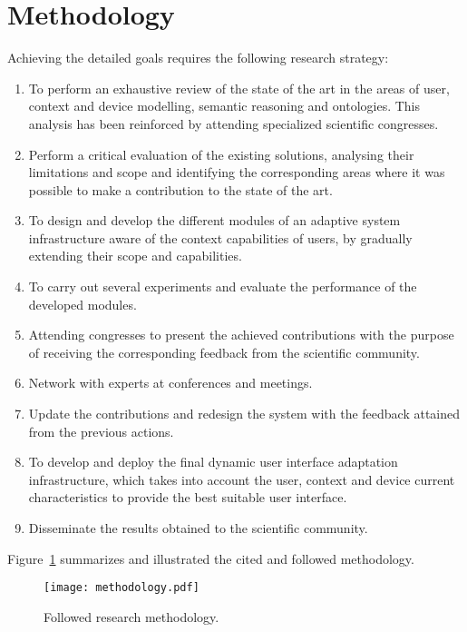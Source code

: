 
\section{Methodology}
\label{sec:methodology}

Achieving the detailed goals requires the following research strategy:

\begin{enumerate}[label=\alph*)]
  \item To perform an exhaustive review of the state of the art in the areas 
  of user, context and device modelling, semantic reasoning and ontologies.   
  This analysis has been reinforced by attending specialized scientific   
  congresses.
  
  \item Perform a critical evaluation of the existing solutions, analysing 
  their limitations and scope and identifying the corresponding areas where it 
  was possible to make a contribution to the state of the art.
  
  \item To design and develop the different modules of an adaptive system 
  infrastructure aware of the context capabilities of users, by gradually 
  extending their scope and capabilities.
  
  \item To carry out several experiments and evaluate the performance of the 
  developed modules.
  
  \item Attending congresses to present the achieved contributions with the 
  purpose of receiving the corresponding feedback from the scientific 
  community.
  
  \item Network with experts at conferences and meetings.
  
  \item Update the contributions and redesign the system with the feedback 
  attained from the previous actions.
  
  \item To develop and deploy the final dynamic user interface adaptation 
  infrastructure, which takes into account the user, context and device current 
  characteristics to provide the best suitable user interface.
  
  \item Disseminate the results obtained to the scientific community.
\end{enumerate}

Figure~\ref{fig:methodology} summarizes and illustrated the cited and 
followed methodology.


\begin{figure}[H]
\centering
\texttt{[image: methodology.pdf]}
\caption{Followed research methodology.}
\label{fig:methodology}
\end{figure}